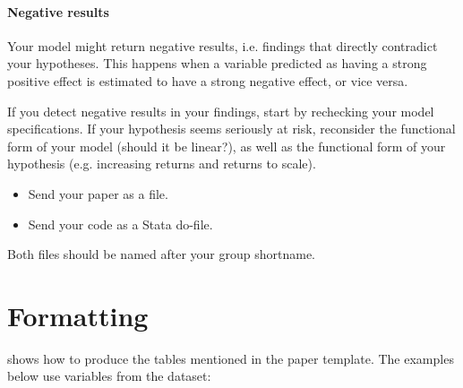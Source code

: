
  

\paragraph{Negative results} Your model might return negative results, i.e. findings that directly contradict your hypotheses. This happens when a variable predicted as having a strong positive effect is estimated to have a strong negative effect, or vice versa.%

  If you detect negative results in your findings, start by rechecking your model specifications. If your hypothesis seems seriously at risk, reconsider the functional form of your model (should it be linear?), as well as the functional form of your hypothesis (e.g. increasing returns and returns to scale).%

%

\begin{itemize}
  \item Send your paper as a \PDF file.
  \item Send your code as a Stata do-file.
\end{itemize}

Both files should be named after your group shortname.

\section{Formatting}

 shows how to produce the tables mentioned in the paper template. The examples below use variables from the \qog{} dataset:%

